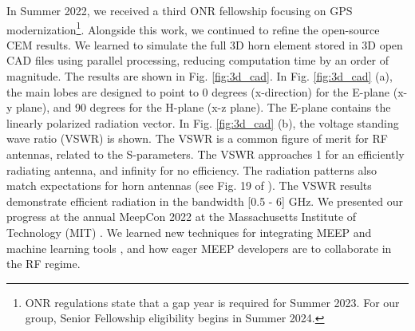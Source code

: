 \documentclass[11pt]{amsart}
\begin{document}
In Summer 2022, we received a third ONR fellowship focusing on GPS modernization\footnote{ONR regulations state that a gap year is required for Summer 2023.  For our group, Senior Fellowship eligibility begins in Summer 2024.}.  Alongside this work, we continued to refine the open-source CEM results.  We learned to simulate the full 3D horn element stored in 3D open CAD files using parallel processing, reducing computation time by an order of magnitude.  The results are shown in Fig. \ref{fig:3d_cad}.  In Fig. \ref{fig:3d_cad} (a), the main lobes are designed to point to 0 degrees (x-direction) for the E-plane (x-y plane), and 90 degrees for the H-plane (x-z plane).  The E-plane contains the linearly polarized radiation vector.  In Fig. \ref{fig:3d_cad} (b), the voltage standing wave ratio (VSWR) is shown.  The VSWR is a common figure of merit for RF antennas, related to the S-parameters.  The VSWR approaches 1 for an efficiently radiating antenna, and infinity for no efficiency.  The radiation patterns also match expectations for horn antennas (see Fig. 19 of \cite{8786183}).  The VSWR results demonstrate efficient radiation in the bandwidth [0.5 - 6] GHz.  We presented our progress at the annual MeepCon 2022 at the Massachusetts Institute of Technology (MIT) \cite{meepcon2022}.  We learned new techniques for integrating MEEP and machine learning tools \cite{meepcon2022_2}, and how eager MEEP developers are to collaborate in the RF regime.  
\end{document}
